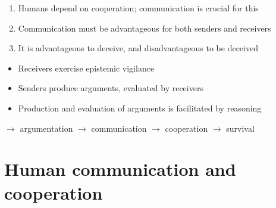 \documentclass[xcolor=table]{beamer}       %
\begin{document}
\begin{frame}{\insertsection}
    \begin{block}{\citet{MS11}}
    \begin{enumerate}[<+->]
        \item Humans depend on cooperation; communication is crucial for this
        \item Communication must be advantageous for both senders and receivers
        \item It is advantageous to deceive, and disadvantageous to be deceived
    \end{enumerate}
    \begin{itemize}[<+->]
        \item Receivers exercise epistemic vigilance
        \item Senders produce arguments, evaluated by receivers
        \item Production and evaluation of arguments is facilitated by \alert{reasoning}
    \end{itemize}
    \end{block}
    \centering
    \pause $\to$ argumentation
    \pause $\to$ communication
    \pause $\to$ cooperation
    \pause $\to$ survival
\end{frame}

\section{Human communication and cooperation}
\end{document}
